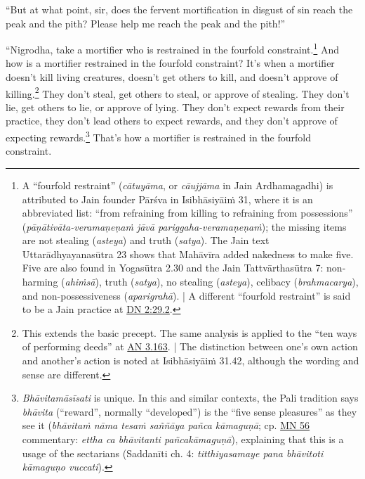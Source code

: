 \documentclass[12pt,openany]{book}%
\begin{document}
“But at what point, sir, does the fervent mortification in disgust of sin reach the peak and the pith? Please help me reach the peak and the pith!” 

“Nigrodha, take a mortifier who is restrained in the fourfold constraint.\footnote{A “fourfold restraint” (\textit{\textsanskrit{cātuyāma}}, or \textit{\textsanskrit{cāujjāma}} in Jain Ardhamagadhi) is attributed to Jain founder \textsanskrit{Pārśva} in \textsanskrit{Isibhāsiyāiṁ} 31, where it is an abbreviated list: “from refraining from killing to refraining from possessions” (\textit{\textsanskrit{pāṇātivāta}-\textsanskrit{veramaṇeṇaṁ} \textsanskrit{jāvā} pariggaha-\textsanskrit{veramaṇeṇaṁ}}); the missing items are not stealing (\textit{asteya}) and truth (\textit{satya}). The Jain text \textsanskrit{Uttarādhyayanasūtra} 23 shows that \textsanskrit{Mahāvīra} added nakedness to make five. Five are also found in \textsanskrit{Yogasūtra} 2.30 and the Jain \textsanskrit{Tattvārthasūtra} 7: non-harming (\textit{\textsanskrit{ahiṁsā}}), truth (\textit{satya}), no stealing (\textit{asteya}), celibacy (\textit{brahmacarya}), and non-possessiveness (\textit{\textsanskrit{aparigrahā}}). | A different “fourfold restraint” is said to be a Jain practice at \href{https://suttacentral.net/dn2/en/sujato\#29.2}{DN 2:29.2}. } And how is a mortifier restrained in the fourfold constraint? It’s when a mortifier doesn’t kill living creatures, doesn’t get others to kill, and doesn’t approve of killing.\footnote{This extends the basic precept. The same analysis is applied to the “ten ways of performing deeds” at \href{https://suttacentral.net/an3.163/en/sujato}{AN 3.163}. | The distinction between one’s own action and another’s action is noted at \textsanskrit{Isibhāsiyāiṁ} 31.42, although the wording and sense are different. } They don’t steal, get others to steal, or approve of stealing. They don’t lie, get others to lie, or approve of lying. They don’t expect rewards from their practice, they don’t lead others to expect rewards, and they don’t approve of expecting rewards.\footnote{\textit{\textsanskrit{Bhāvitamāsīsati}} is unique. In this and similar contexts, the Pali tradition says \textit{\textsanskrit{bhāvita}} (“reward”, normally “developed”) is the “five sense pleasures” as they see it (\textit{\textsanskrit{bhāvitaṁ} \textsanskrit{nāma} \textsanskrit{tesaṁ} \textsanskrit{saññāya} \textsanskrit{pañca} \textsanskrit{kāmaguṇā}}; cp. \href{https://suttacentral.net/mn56/en/sujato}{MN 56} commentary: \textit{ettha ca \textsanskrit{bhāvitanti} \textsanskrit{pañcakāmaguṇā}}), explaining that this is a usage of the sectarians (\textsanskrit{Saddanīti} ch. 4: \textit{titthiyasamaye pana \textsanskrit{bhāvitoti} \textsanskrit{kāmaguṇo} vuccati}). } That’s how a mortifier is restrained in the fourfold constraint. 
\end{document}
